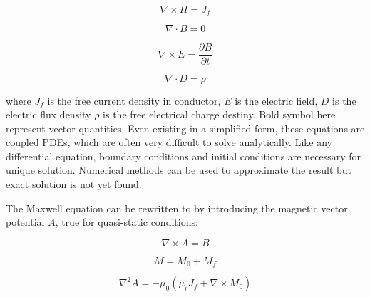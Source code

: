     
        \begin{equation}
            \nabla \times H = J_f
            \label{eq:ampere's circuit law}
        \end{equation}
        
        \begin{equation}
            \nabla \cdot B = 0
            \label{eq:gauss's magnetism law}
        \end{equation}
        
        \begin{equation}
            \nabla \times E = \frac{\partial B}{\partial t}
            \label{eq:maxwell-faraday's law}
        \end{equation}
    
        \begin{equation}
            \nabla \cdot D = \rho
            \label{eq:gauss's law}
        \end{equation}
    
    
        where $J_f$ is the free current density in conductor, $E$ is the electric field, $D$ is the electric flux density $\rho$ is the free electrical charge destiny. Bold symbol here represent vector quantities. Even existing in a simplified form, these equations are coupled \acsp{PDE}, which are often very difficult to solve analytically. Like any differential equation, boundary conditions and initial conditions are necessary for unique solution. Numerical methods can be used to approximate the result but exact solution is not yet found.
        
        
        The Maxwell equation can be rewritten to by introducing the magnetic vector potential $A$, true for quasi-static conditions:
        
        
        \begin{equation}
            \nabla \times A = B
            \label{eq:curl of A is B}
        \end{equation}        
        
        \begin{equation}
            M = M_0 + M_f
            \label{eq:component of magnetization}
        \end{equation}     
        
        \begin{equation}
            {\nabla}^2 A = -{\mu}_0 ({\mu}_r J_f + \nabla \times M_0)
            \label{eq:relation of A to Magnetization and free current}
        \end{equation}        
        
